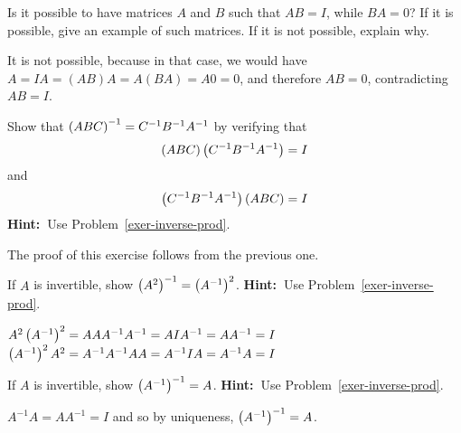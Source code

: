 \begin{enumialphparenastyle}
\begin{ex}
  Is it possible to have matrices $A$ and $B$ such that $AB=I$, while
  $BA=0$? If it is possible, give an example of such matrices. If it
  is not possible, explain why.
  \begin{sol}
    It is not possible, because in that case, we would have
    $A=IA=(AB)A=A(BA)=A0=0$, and therefore $AB=0$, contradicting $AB=I$.
  \end{sol}
\end{ex}

\begin{ex}Show that $\left(ABC\right) ^{-1}=C^{-1}B^{-1}A^{-1}$ by verifying
that 
\[
\left(ABC\right) \left(C^{-1}B^{-1}A^{-1}\right) =I
\]
and 
\[\left(C^{-1}B^{-1}A^{-1}\right)\left(ABC\right) =I
\] 
\textbf{Hint:\ }Use Problem~\ref{exer-inverse-prod}. 
\begin{sol}
The proof of this exercise follows from the previous one.
\end{sol}
\end{ex}

\begin{ex}If $A$ is invertible, show $\left(A^{2}\right) ^{-1}=\left(
A^{-1}\right) ^{2}$. \textbf{Hint:\ }Use Problem~\ref{exer-inverse-prod}. 
\begin{sol}
$A^{2}\left(A^{-1}\right) ^{2}=AAA^{-1}A^{-1}=AIA^{-1}=AA^{-1}=I$ $\left(
A^{-1}\right) ^{2}A^{2}=A^{-1}A^{-1}AA=A^{-1}IA=A^{-1}A=I$
\end{sol}
\end{ex}

\begin{ex}If $A$ is invertible, show $\left(A^{-1}\right) ^{-1}=A$. 
\textbf{Hint:\ }Use Problem~\ref{exer-inverse-prod}. 
\begin{sol}
 $A^{-1}A=AA^{-1}=I$ and so by
uniqueness, $\left(A^{-1}\right) ^{-1}=A$.
\end{sol}
\end{ex}

\end{enumialphparenastyle}
